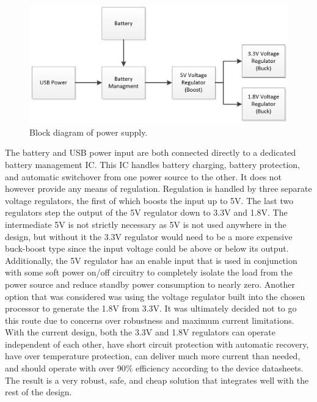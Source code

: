 \begin{figure}[!htb]
\centering
\includegraphics[width=\textwidth]{images/BlockDiagram_PowerSupply.png}
\caption{Block diagram of power supply.}
\label{fig:BlockDiagram_PowerSupply}
\end{figure}

The battery and USB power input are both connected directly to a dedicated 
battery management IC. This IC handles battery charging, battery protection, 
and automatic switchover from one power source to the other. It does not 
however provide any means of regulation. Regulation is handled by three 
separate voltage regulators, the first of which boosts the input up to 5V. The 
last two regulators step the output of the 5V regulator down to 3.3V and 1.8V. 
The intermediate 5V is not strictly necessary as 5V is not used anywhere in the 
design, but without it the 3.3V regulator would need to be a more expensive 
buck-boost type since the input voltage could be above or below its output. 
Additionally, the 5V regulator has an enable input that is used in conjunction 
with some soft power on/off circuitry to completely isolate the load from the 
power source and reduce standby power consumption to nearly zero. Another option 
that was considered was using the voltage regulator built into the chosen 
processor to generate the 1.8V from 3.3V. It was ultimately decided not to go 
this route due to concerns over robustness and maximum current limitations. With 
the current design, both the 3.3V and 1.8V regulators can operate independent of 
each other, have short circuit protection with automatic recovery, have over 
temperature protection, can deliver much more current than needed, and should 
operate with over 90\% efficiency according to the device datasheets. The result 
is a very robust, safe, and cheap solution that integrates well with the rest of 
the design.

